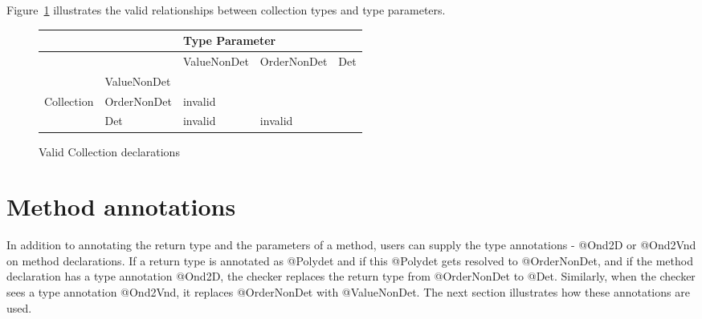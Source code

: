 Figure~\ref{fig-nondeterminism-collections} illustrates the valid
relationships between collection types and type parameters.

\begin{figure}
  \centering
  \begin{tabular}{|l|l|l|l|l|}
    \hline
    &   &  \multicolumn{3}{l|}{Type Parameter}                                                                       \\ \hline
    &             & ValueNonDet                                     & OrderNonDet              & Det \\ \cline{2-5}
              & ValueNonDet &                                                 &                          &     \\ \cline{2-5}
Collection    & OrderNonDet &   invalid  &                          &     \\ \cline{2-5}
              & Det         &   invalid               &    invalid  &     \\ \hline
  \end{tabular}
  \caption{Valid Collection declarations}
  \label{fig-nondeterminism-collections}
\end{figure}





\section{Method annotations\label{nondeterminism-method-annotations}}
In addition to annotating the return type and the parameters of a method, users can supply the type annotations -
@Ond2D or @Ond2Vnd on method declarations.
If a return type is annotated as @Polydet and if this @Polydet gets resolved to @OrderNonDet, and if the method declaration has a type annotation @Ond2D,
the checker replaces the return type from @OrderNonDet to @Det. Similarly, when the checker sees a type annotation @Ond2Vnd, it
replaces @OrderNonDet with @ValueNonDet. The next section illustrates how these annotations are used.

